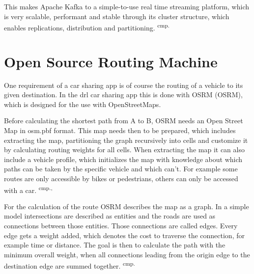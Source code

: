 This makes Apache Kafka to a simple-to-use real time streaming platform, which is very scalable, performant and stable through its cluster structure, which enables replications, distribution and partitioning. \textsuperscript{cmp.\cite{28}}


\section{Open Source Routing Machine}

One requirement of a car sharing app is of course the routing of a vehicle to its given destination. In the drl car sharing app this is done with \acs{OSRM} (\acl{OSRM}), which is designed for the use with OpenStreetMaps.

Before calculating the shortest path from A to B, OSRM needs an Open Street Map in osm.pbf format. This map needs then to be prepared, which includes extracting the map, partitioning the graph recursively into cells and customize it by calculating routing weights for all cells. When extracting the map it can also include a vehicle profile, which initializes the map with knowledge about which paths can be taken by the specific vehicle and which can't. For example some routes are only accessible by bikes or pedestrians, others can only be accessed with a car.  \textsuperscript{cmp.\cite{29}, \cite{30}}


For the calculation of the route OSRM describes the map as a graph. In a simple model intersections are described as entities and the roads are used as connections between those entities. Those connections are called edges. Every edge gets a weight added, which denotes the cost to traverse the connection, for example time or distance. The goal is then to calculate the path with the minimum overall weight, when all connections leading from the origin edge to the destination edge are summed together. \textsuperscript{cmp.\cite{31}}


